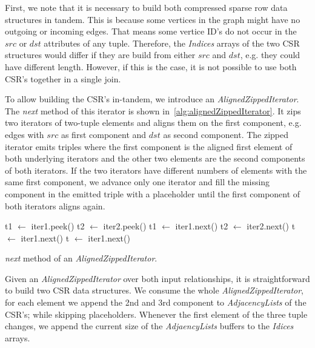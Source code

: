 First, we note that it is necessary to build both compressed sparse row data structures in tandem.
This is because some vertices in the graph might have no outgoing or incoming edges.
That means some vertice ID's do not occur in the $src$ or $dst$ attributes of any tuple.
Therefore, the \textit{Indices} arrays of the two CSR structures would differ if they are build from either $src$ and $dst$, e.g.
they could have different length.
However, if this is the case, it is not possible to use both CSR's together in a single join.

To allow building the CSR's in-tandem, we introduce an \textit{AlignedZippedIterator}.
The \textit{next} method of this iterator is shown in~\cref{alg:alignedZippedIterator}.
It zips two iterators of two-tuple elements and aligns them on the first component, e.g. edges with $src$ as first component and $dst$ as
second component.
The zipped iterator emits triples where the first component is the aligned first element of both underlying iterators and the other
two elements are the second components of both iterators.
If the two iterators have different numbers of elements with the same first component, we advance only one iterator and fill the missing
component in the emitted triple with a placeholder until the first component of both iterators aligns again.

\begin{algorithm}
   {
    t1 $\leftarrow$ iter1.peek() \;
    t2 $\leftarrow$ iter2.peek() \;
     {
      t1 $\leftarrow$ iter1.next()\;
      t2 $\leftarrow $ iter2.next()\;
      \;
    }  {
      t $\leftarrow$ iter1.next()\;
       \;
    } 
  }  {
    t $\leftarrow$ iter1.next() \;
     \;
  } 
  \caption{\textit{next} method of an \textit{AlignedZippedIterator}.}
  \label{alg:alignedZippedIterator}
\end{algorithm}


Given an \textit{AlignedZippedIterator} over both input relationships, it is straightforward to build two CSR data structures.
We consume the whole \textit{AlignedZippedIterator}, for each element we append the 2nd and 3rd component to \textit{AdjacencyLists} of
the CSR's;
while skipping placeholders.
Whenever the first element of the three tuple changes, we append the current size of the \textit{AdjaencyLists} buffers to the
\textit{Idices} arrays.

